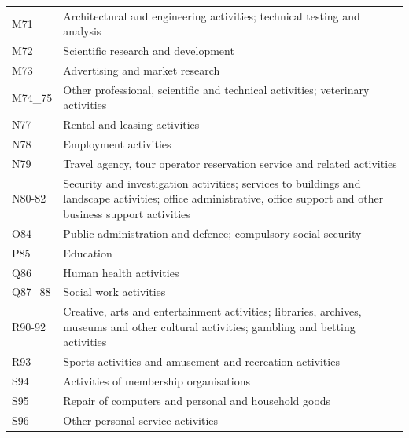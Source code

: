 \begin{table}[!htb]
{\begin{tabular}{l p{}}
		M71 & Architectural and engineering activities; technical testing and analysis \\
		M72 & Scientific research and development \\
		M73 & Advertising and market research \\
		M74\_75 & Other professional, scientific and technical activities; veterinary activities \\
		N77 & Rental and leasing activities \\
		N78 & Employment activities \\
		N79 & Travel agency, tour operator reservation service and related activities \\
		N80-82 & Security and investigation activities; services to buildings and landscape activities; office administrative, office support and other business support activities \\
		O84 & Public administration and defence; compulsory social security \\
		P85 & Education \\
		Q86 & Human health activities \\
		Q87\_88 & Social work activities \\
		R90-92 & Creative, arts and entertainment activities; libraries, archives, museums and other cultural activities; gambling and betting activities \\
		R93 & Sports activities and amusement and recreation activities \\
		S94 & Activities of membership organisations \\
		S95 & Repair of computers and personal and household goods \\
		S96 & Other personal service activities \\
		\bottomrule
	\end{tabular}
	} 
\end{table}
